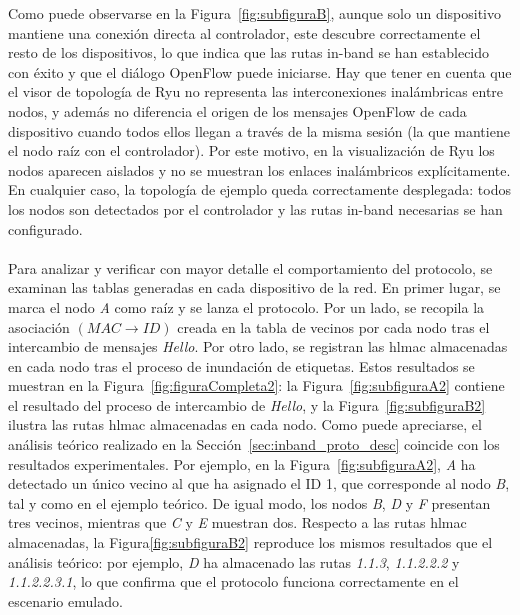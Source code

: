 Como puede observarse en la Figura~\ref{fig:subfiguraB}, aunque solo un dispositivo mantiene una conexión directa al controlador, este descubre correctamente el resto de los dispositivos, lo que indica que las rutas in-band se han establecido con éxito y que el diálogo OpenFlow puede iniciarse. Hay que tener en cuenta que el visor de topología de Ryu no representa las interconexiones inalámbricas entre nodos, y además no diferencia el origen de los mensajes OpenFlow de cada dispositivo cuando todos ellos llegan a través de la misma sesión (la que mantiene el nodo raíz con el controlador). Por este motivo, en la visualización de Ryu los nodos aparecen aislados y no se muestran los enlaces inalámbricos explícitamente. En cualquier caso, la topología de ejemplo queda correctamente desplegada: todos los nodos son detectados por el controlador y las rutas in-band necesarias se han configurado.\\
\\
Para analizar y verificar con mayor detalle el comportamiento del protocolo, se examinan las tablas generadas en cada dispositivo de la red. En primer lugar, se marca el nodo \textit{A} como raíz y se lanza el protocolo. Por un lado, se recopila la asociación \((MAC \rightarrow ID)\) creada en la tabla de vecinos por cada nodo tras el intercambio de mensajes \textit{Hello}. Por otro lado, se registran las \gls{hlmac} almacenadas en cada nodo tras el proceso de inundación de etiquetas. Estos resultados se muestran en la Figura~\ref{fig:figuraCompleta2}: la Figura~\ref{fig:subfiguraA2} contiene el resultado del proceso de intercambio de \textit{Hello}, y la Figura~\ref{fig:subfiguraB2} ilustra las rutas \gls{hlmac} almacenadas en cada nodo. Como puede apreciarse, el análisis teórico realizado en la Sección~\ref{sec:inband_proto_desc} coincide con los resultados experimentales. Por ejemplo, en la Figura~\ref{fig:subfiguraA2}, \textit{A} ha detectado un único vecino al que ha asignado el ID 1, que corresponde al nodo \textit{B}, tal y como en el ejemplo teórico. De igual modo, los nodos \textit{B}, \textit{D} y \textit{F} presentan tres vecinos, mientras que \textit{C} y \textit{E} muestran dos. Respecto a las rutas \gls{hlmac} almacenadas, la Figura\ref{fig:subfiguraB2} reproduce los mismos resultados que el análisis teórico: por ejemplo, \textit{D} ha almacenado las rutas \textit{1.1.3}, \textit{1.1.2.2.2} y \textit{1.1.2.2.3.1}, lo que confirma que el protocolo funciona correctamente en el escenario emulado.

